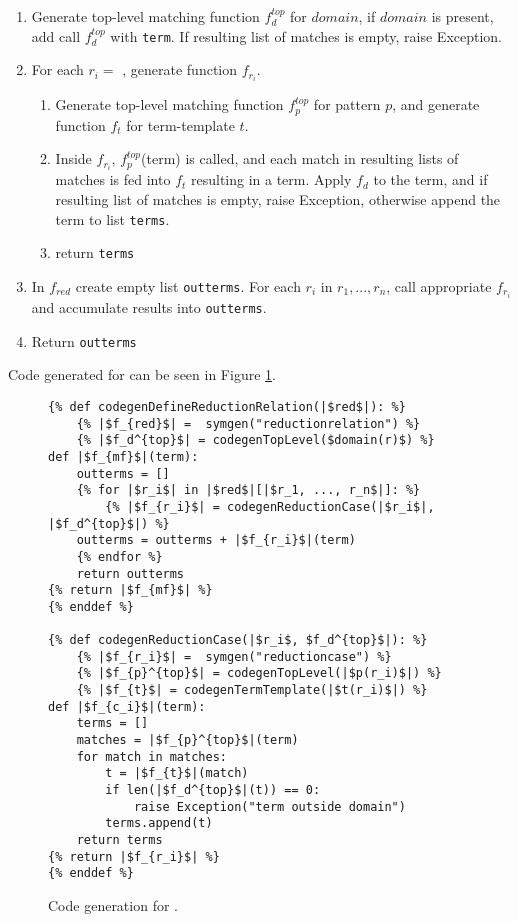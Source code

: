 \begin{enumerate}
\item Generate top-level matching function $f_d^{top}$ for $domain$, if $domain$ is present, add call $f_d^{top}$ with \texttt{term}. If resulting list of matches is empty, raise Exception.
\item For each $r_i= $ \ReductionCase, generate function $f_{r_i}$.
	\begin{enumerate}
	\item Generate top-level matching function $f_p^{top}$ for pattern $p$, and generate function $f_t$ for term-template $t$.
	\item Inside $f_{r_i}$, $f_p^{top}$(term) is called, and each match in resulting lists of matches is fed into $f_t$ resulting in a term. Apply $f_d$ to the term, and if resulting list of matches is empty, raise Exception, otherwise append the term to list \texttt{terms}.
	\item return \texttt{terms}
	\end{enumerate}
\item In $f_{red}$ create empty list \texttt{outterms}. For each $r_i$ in $r_1, ..., r_n$, call appropriate $f_{r_i}$ and accumulate results into \texttt{outterms}.
\item Return \texttt{outterms}
\end{enumerate}

Code generated for \DefineReductionRelationNoArgs \space can be seen in Figure \ref{codegen-define-red}.

\begin{figure}
\begin{verbatim}
{% def codegenDefineReductionRelation(|$red$|): %}
	{% |$f_{red}$| =  symgen("reductionrelation") %}
	{% |$f_d^{top}$| = codegenTopLevel($domain(r)$) %}
def |$f_{mf}$|(term):
	outterms = []
	{% for |$r_i$| in |$red$|[|$r_1, ..., r_n$|]: %}
		{% |$f_{r_i}$| = codegenReductionCase(|$r_i$|, |$f_d^{top}$|) %}
	outterms = outterms + |$f_{r_i}$|(term)
	{% endfor %}
	return outterms
{% return |$f_{mf}$| %}
{% enddef %}

{% def codegenReductionCase(|$r_i$, $f_d^{top}$|): %}
	{% |$f_{r_i}$| =  symgen("reductioncase") %}
	{% |$f_{p}^{top}$| = codegenTopLevel(|$p(r_i)$|) %}
	{% |$f_{t}$| = codegenTermTemplate(|$t(r_i)$|) %}
def |$f_{c_i}$|(term):
	terms = []
	matches = |$f_{p}^{top}$|(term)
	for match in matches:
		t = |$f_{t}$|(match)
		if len(|$f_d^{top}$|(t)) == 0:
			raise Exception("term outside domain")
		terms.append(t)
	return terms
{% return |$f_{r_i}$| %}
{% enddef %}
\end{verbatim}
\caption{Code generation for \DefineReductionRelationNoArgs.}
\label{codegen-define-red}
\end{figure}
